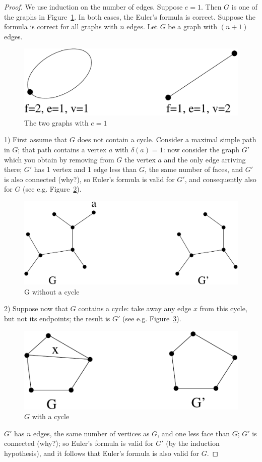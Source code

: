 \begin{proof} We use induction on the number of edges. Suppose
$e=1$. Then $G$ is one of the graphs in Figure~\ref{euler1}. In
both cases, the Euler's formula is correct.  Suppose the formula is
correct for all graphs with $n$ edges. Let $G$ be a graph with $(n+1)$
edges.

\begin{figure}[ht]
\begin{center}
\includegraphics[width=0.4\linewidth,keepaspectratio]{euler1}
\end{center}
\caption{The two graphs with $e=1$ \label{euler1}}
\end{figure}

1) First assume that $G$ does not contain a cycle. Consider a maximal
simple path in $G$; that path contains a vertex $a$ with $\delta(a) =
1$: now consider the graph $G'$ which you obtain by removing from $G$
the vertex $a$ and the only edge arriving there; $G'$ has 1 vertex
and 1 edge less than $G$, the same number of faces, and $G'$ is also
connected (why?), so Euler's formula is valid for $G'$, and
consequently also for $G$ (see e.g. Figure~\ref{euler2}).\\
\begin{figure}[ht]
\begin{center}
\includegraphics[width=0.4\linewidth,keepaspectratio]{euler2}
\end{center}
\caption{G without a cycle \label{euler2}}
\end{figure}

2) Suppose now that $G$ contains a cycle: take away any edge $x$ from
this cycle, but not its endpoints; the result is $G'$ (see
e.g. Figure~\ref{euler3}).
\begin{figure}[ht]
\begin{center}
\includegraphics[width=0.4\linewidth,keepaspectratio]{euler3}
\end{center}
\caption{$G$ with a cycle \label{euler3}}
\end{figure}
$G'$ has $n$ edges, the same number of vertices as $G$, and one less
face than $G$; $G'$ is connected (why?); so Euler's formula is valid
for $G'$ (by the induction hypothesis), and it follows that Euler's
formula is also valid for $G$.
\end{proof}

